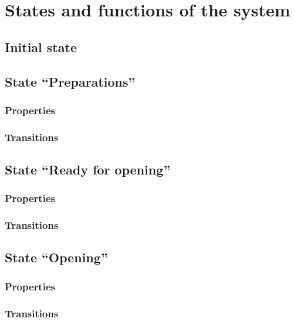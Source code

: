 \chapter{States and functions of the system}\label{cha:stat-funct-syst}

\section{Initial state}\label{sec4:initial-state}

\section{State ``Preparations''}\label{sec4:state-preparations}

\subsection{Properties}\label{sec4:properties}

\subsection{Transitions}\label{sec4:transitions}

\section{State ``Ready for opening''}\label{sec4:state-ready-opening}

\subsection{Properties}\label{sec4:properties1}

\subsection{Transitions}\label{sec4:transitions1}

\section{State ``Opening''}\label{sec4:state-opening}

\subsection{Properties}\label{sec4:properties2}

\subsection{Transitions}\label{sec4:transitions2}

